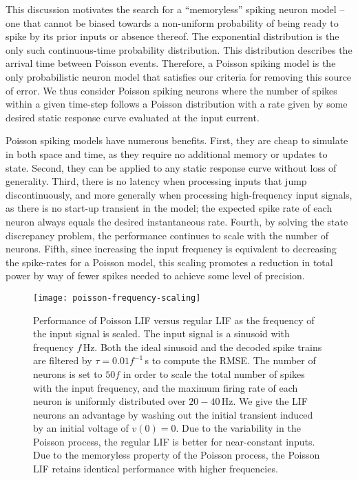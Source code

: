 This discussion motivates the search for a ``memoryless'' spiking neuron model -- one that cannot be biased towards a non-uniform probability of being ready to spike by its prior inputs or absence thereof.
The exponential distribution is the only such continuous-time probability distribution.
This distribution describes the arrival time between Poisson events.
Therefore, a Poisson spiking model is the only probabilistic neuron model that satisfies our criteria for removing this source of error.
We thus consider Poisson spiking neurons where the number of spikes within a given time-step follows a Poisson distribution with a rate given by some desired static response curve evaluated at the input current.

Poisson spiking models have numerous benefits.
First, they are cheap to simulate in both space and time, as they require no additional memory or updates to state.
Second, they can be applied to any static response curve without loss of generality.
Third, there is no latency when processing inputs that jump discontinuously, and more generally when processing high-frequency input signals, as there is no start-up transient in the model; the expected spike rate of each neuron always equals the desired instantaneous rate.
Fourth, by solving the state discrepancy problem, the performance continues to scale with the number of neurons.
Fifth, since increasing the input frequency is equivalent to decreasing the spike-rates for a Poisson model, this scaling promotes a reduction in total power by way of fewer spikes needed to achieve some level of precision.

\begin{figure}
\centering
\texttt{[image: poisson-frequency-scaling]}
\caption{\label{fig:poisson-frequency-scaling} Performance of Poisson LIF versus regular LIF as the frequency of the input signal is scaled.
The input signal is a sinusoid with frequency $f$\,Hz.
Both the ideal sinusoid and the decoded spike trains are filtered by $\tau = 0.01 f^{-1}$\,s to compute the RMSE.
The number of neurons is set to $50 f$ in order to scale the total number of spikes with the input frequency, and the maximum firing rate of each neuron is uniformly distributed over $20-40$\,Hz.
We give the LIF neurons an advantage by washing out the initial transient induced by an initial voltage of $v(0) = 0$.
Due to the variability in the Poisson process, the regular LIF is better for near-constant inputs.
Due to the memoryless property of the Poisson process, the Poisson LIF retains identical performance with higher frequencies.
}
\end{figure}

